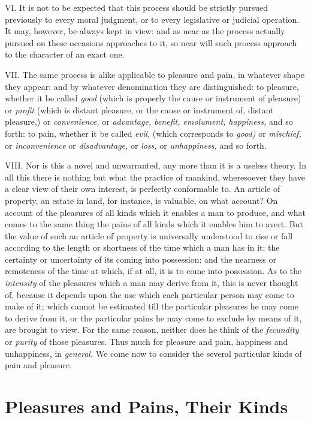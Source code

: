 \documentclass[12pt]{report}
\begin{document}
VI. It is not to be expected that this process should be strictly
pursued previously to every moral judgment, or to every legislative or
judicial operation. It may, however, be always kept in view: and as near
as the process actually pursued on these occasions approaches to it, so
near will such process approach to the character of an exact one.

VII. The same process is alike applicable to pleasure and pain, in
whatever shape they appear: and by whatever denomination they are
distinguished: to pleasure, whether it be called \emph{good} (which is
properly the cause or instrument of pleasure) or \emph{profit} (which is
distant pleasure, or the cause or instrument of, distant pleasure,) or
\emph{convenience,} or \emph{advantage, benefit, emolument, happiness,}
and so forth: to pain, whether it be called \emph{evil,} (which
corresponds to \emph{good)} or \emph{mischief,} or \emph{inconvenience}
or \emph{disadvantage,} or \emph{loss,} or \emph{unhappiness,} and so
forth.

VIII. Nor is this a novel and unwarranted, any more than it is a useless
theory. In all this there is nothing but what the practice of mankind,
wheresoever they have a clear view of their own interest, is perfectly
conformable to. An article of property, an estate in land, for instance,
is valuable, on what account? On account of the pleasures of all kinds
which it enables a man to produce, and what comes to the same thing the
pains of all kinds which it enables him to avert. But the value of such
an article of property is universally understood to rise or fall
according to the length or shortness of the time which a man has in it:
the certainty or uncertainty of its coming into possession: and the
nearness or remoteness of the time at which, if at all, it is to come
into possession. As to the \emph{intensity} of the pleasures which a man
may derive from it, this is never thought of, because it depends upon
the use which each particular person may come to make of it; which
cannot be estimated till the particular pleasures he may come to derive
from it, or the particular pains he may come to exclude by means of it,
are brought to view. For the same reason, neither does he think of the
\emph{fecundity} or \emph{purity} of those pleasures. Thus much for
pleasure and pain, happiness and unhappiness, in \emph{general.} We come
now to consider the several particular kinds of pain and pleasure.

\chapter{Pleasures and Pains, Their Kinds}
\end{document}

